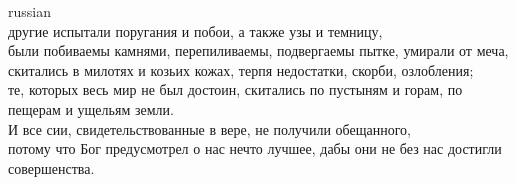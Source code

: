\documentclass[10pt]{article} %
\begin{document}
{\begin{minipage}[t]{0.45\textwidth}
\begin{otherlanguage*}{russian}
\\
другие испытали поругания и побои, а также узы и темницу,
\\
были побиваемы камнями, перепиливаемы, подвергаемы пытке, умирали от меча, скитались в милотях и козьих кожах, терпя недостатки, скорби, озлобления;
\\
те, которых весь мир не был достоин, скитались по пустыням и горам, по пещерам и ущельям земли.
\\
И все сии, свидетельствованные в вере, не получили обещанного,
\\
потому что Бог предусмотрел о нас нечто лучшее, дабы они не без нас достигли совершенства.
\end{otherlanguage*}
\end{minipage}
\hfill
\begin{minipage}[t]{0.49\textwidth}


\end{minipage}}
\end{document}
